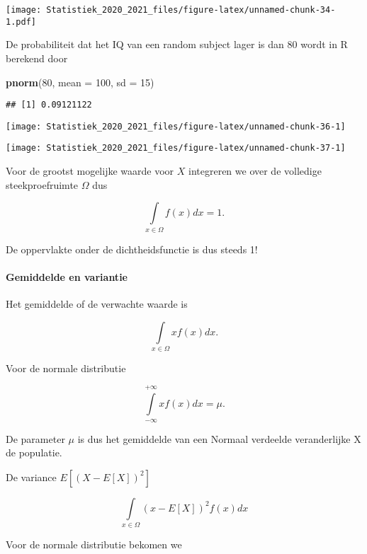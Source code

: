 \documentclass[
  12pt,dutch,coursenotes]{book}
\newenvironment{Shaded}{\begin{snugshade}}{\end{snugshade}}
\newcommand{\DataTypeTok}[1]{\textcolor[rgb]{0.13,0.29,0.53}{#1}}
\newcommand{\DecValTok}[1]{\textcolor[rgb]{0.00,0.00,0.81}{#1}}
\newcommand{\KeywordTok}[1]{\textcolor[rgb]{0.13,0.29,0.53}{\textbf{#1}}}
\newcommand{\NormalTok}[1]{#1}
\theoremstyle{definition}
\theoremstyle{definition}
\theoremstyle{definition}
\theoremstyle{remark}
\begin{document}
\texttt{[image: Statistiek\_2020\_2021\_files/figure-latex/unnamed-chunk-34-1.pdf]}

De probabiliteit dat het IQ van een random subject lager is dan 80 wordt in R berekend door

\begin{Shaded}
\begin{Highlighting}[]
\KeywordTok{pnorm}\NormalTok{(}\DecValTok{80}\NormalTok{, }\DataTypeTok{mean =} \DecValTok{100}\NormalTok{, }\DataTypeTok{sd =} \DecValTok{15}\NormalTok{)}
\end{Highlighting}
\end{Shaded}

\begin{verbatim}
## [1] 0.09121122
\end{verbatim}

\begin{center}\texttt{[image: Statistiek\_2020\_2021\_files/figure-latex/unnamed-chunk-36-1]} \end{center}

\begin{center}\texttt{[image: Statistiek\_2020\_2021\_files/figure-latex/unnamed-chunk-37-1]} \end{center}

Voor de grootst mogelijke waarde voor \(X\) integreren we over de volledige steekproefruimte \(\Omega\) dus

\[\int \limits_{x \in \Omega} f(x) dx=1.\]

De oppervlakte onder de dichtheidsfunctie is dus steeds 1!

\hypertarget{gemiddelde-en-variantie}{%
\paragraph{Gemiddelde en variantie}\label{gemiddelde-en-variantie}}

Het gemiddelde of de verwachte waarde is

\[\int \limits_{x \in \Omega} x f(x) dx.\]

Voor de normale distributie

\[\int \limits_{-\infty}^{+\infty} x f(x) dx = \mu.\]

De parameter \(\mu\) is dus het gemiddelde van een Normaal verdeelde veranderlijke X de populatie.

De variance \(E[(X-E[X])^2]\)

\[\int \limits_{x \in \Omega} (x-E[X])^2 f(x) dx\]

Voor de normale distributie bekomen we
\end{document}
